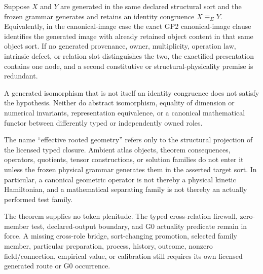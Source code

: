 \documentclass[12pt,a4paper]{article}
\begin{document}
\begin{corollary}
\label{p2a:cor:typed-generated-identity-deduplication}
Suppose \(X\) and \(Y\) are generated in the same declared structural sort and
the frozen grammar generates and retains an identity congruence
\(X\equiv_{\Sigma}Y\).  Equivalently, in the canonical-image case the exact
GP2 canonical-image clause identifies the generated image with already
retained object content in that same object sort.  If no generated
provenance, owner, multiplicity, operation law, intrinsic defect, or relation
slot distinguishes the two, the exactified presentation contains one node,
and a second constitutive or structural-physicality premise is redundant.

A generated isomorphism that is not itself an identity congruence does not
satisfy the hypothesis.  Neither do abstract isomorphism, equality of
dimension or numerical invariants, representation equivalence, or a canonical
mathematical functor between differently typed or independently owned roles.
\end{corollary}

\begin{remark}
\label{p2a:rem:typed-structural-geometrization-boundary}
The name ``effective rooted geometry'' refers only to the structural
projection of the licensed typed closure.  Ambient atlas objects, theorem
consequences, operators, quotients, tensor constructions, or solution families
do not enter it unless the frozen physical grammar generates them in the
asserted target sort.  In particular, a canonical geometric operator is not
thereby a physical kinetic Hamiltonian, and a mathematical separating family
is not thereby an actually performed test family.

The theorem supplies no token plenitude.  The typed cross-relation firewall,
zero-member test, declared-output boundary, and G0 actuality predicate remain
in force.  A missing cross-role bridge, sort-changing promotion, selected
family member, particular preparation, process, history, outcome, nonzero
field/connection, empirical value, or calibration still requires its own
licensed generated route or G0 occurrence.
\end{remark}
\end{document}

